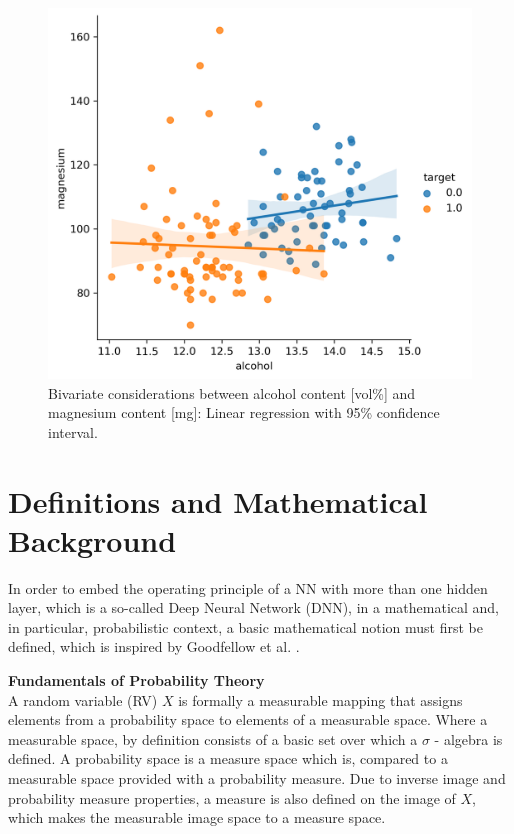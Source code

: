 \begin{figure}
	\centering
	\includegraphics[scale=0.18]{images/corr_wine.png}
\caption[Regression of 2 wine data set features]{Bivariate considerations between alcohol content [vol\%] and magnesium content [mg]: Linear regression with 95\% confidence interval.}
\label{fig:corr_wine}
\end{figure}


\section{Definitions and Mathematical Background}
In order to embed the operating principle of a NN with more than one hidden layer, which is a so-called Deep Neural Network (DNN), in a mathematical and, in particular, probabilistic context, a basic mathematical notion must first be defined, which is inspired by Goodfellow et al. \cite{Goodfellow-et-al-2016}.

\textbf{Fundamentals of Probability Theory}\\
A random variable (RV) $X$ is formally a measurable mapping that assigns elements from a probability space to elements of a measurable space. Where a measurable space, by definition consists of a basic set over which a $\sigma$ - algebra is defined. A probability space is a measure space which is, compared to a measurable space provided with a probability measure. Due to inverse image and probability measure properties, a measure is also defined on the image of $X$, which makes the measurable image space to a measure space.

